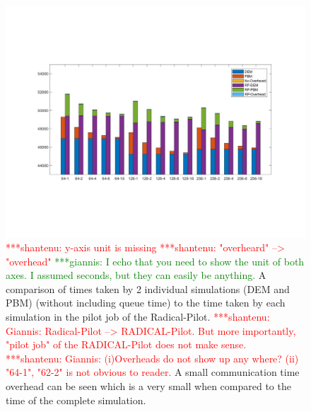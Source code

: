 \documentclass[preprint,11pt,authoryear]{elsarticle}
\newcommand{\jhanote}[1]{ {\textcolor{red} { ***shantenu: #1 }}}
\newcommand{\gpnote}[1]{{\textcolor{green} {***giannis: #1}}}
\newcommand{\jhanote}[1]{ {\textcolor{red} { ***shantenu: #1 }}}
\newcommand{\gpnote}[1]{}
\begin{document}
\begin{figure}[ht]
\centering
\includegraphics[scale=0.7]{rp_final.pdf}
\caption{\jhanote{y-axis unit is missing} \jhanote{"overheard" --> "overhead"}\gpnote{I echo that you need to show the unit of both axes. I assumed seconds, but they can easily be anything.} A comparison of times taken by 2 individual simulations (DEM and PBM) (without 
including queue time) to the  time taken by each simulation in the pilot job
of the Radical-Pilot. \jhanote{Giannis: Radical-Pilot --> RADICAL-Pilot. But
more importantly, "pilot job" of the RADICAL-Pilot does not make sense.}
\jhanote{Giannis: (i)Overheads do not show up any where? (ii) "64-1", "62-2"
is not obvious to reader.}A small communication time overhead can be seen
which is a very small when compared to the time of the complete simulation.}
\label{fig:rslts_RP_time_plot}
\end{figure}
	    
\end{document}
